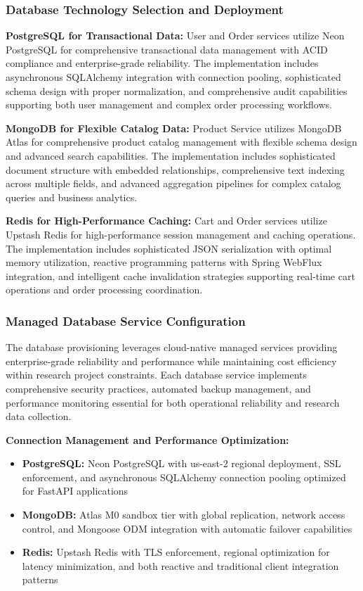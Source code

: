 \subsubsection{Database Technology Selection and Deployment}



\textbf{PostgreSQL for Transactional Data:}
User and Order services utilize Neon PostgreSQL for comprehensive transactional data management with ACID compliance and enterprise-grade reliability. The implementation includes asynchronous SQLAlchemy integration with connection pooling, sophisticated schema design with proper normalization, and comprehensive audit capabilities supporting both user management and complex order processing workflows.

\textbf{MongoDB for Flexible Catalog Data:}
Product Service utilizes MongoDB Atlas for comprehensive product catalog management with flexible schema design and advanced search capabilities. The implementation includes sophisticated document structure with embedded relationships, comprehensive text indexing across multiple fields, and advanced aggregation pipelines for complex catalog queries and business analytics.

\textbf{Redis for High-Performance Caching:}
Cart and Order services utilize Upstash Redis for high-performance session management and caching operations. The implementation includes sophisticated JSON serialization with optimal memory utilization, reactive programming patterns with Spring WebFlux integration, and intelligent cache invalidation strategies supporting real-time cart operations and order processing coordination.

\subsubsection{Managed Database Service Configuration}

The database provisioning leverages cloud-native managed services providing enterprise-grade reliability and performance while maintaining cost efficiency within research project constraints. Each database service implements comprehensive security practices, automated backup management, and performance monitoring essential for both operational reliability and research data collection.

\textbf{Connection Management and Performance Optimization:}
\begin{itemize}
\item \textbf{PostgreSQL:} Neon PostgreSQL with us-east-2 regional deployment, SSL enforcement, and asynchronous SQLAlchemy connection pooling optimized for FastAPI applications
\item \textbf{MongoDB:} Atlas M0 sandbox tier with global replication, network access control, and Mongoose ODM integration with automatic failover capabilities
\item \textbf{Redis:} Upstash Redis with TLS enforcement, regional optimization for latency minimization, and both reactive and traditional client integration patterns
\end{itemize}

